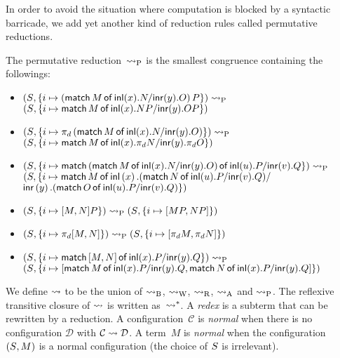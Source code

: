 In order to avoid the situation where computation is blocked by
a syntactic barricade,
we add yet another kind of reduction rules called permutative
 reductions.
\begin{definition}
 The permutative reduction~$\preduce$ is the smallest congruence
 containing the followings:
\begin{itemize}
 \small
 \item $\conf{}{\imapsto{ \left(\mat  M x N y O\right) P }}\preduce$ \\
       $\conf{}{\imapsto{ \mat M x {N P} y {O P} }}$
 \item $\conf{}{\imapsto{ \pi_d \left(\mat M x N y
       O\right)}}\preduce$\\
       $\conf{}{\imapsto{ \mat M x
       {\pi_d N} y {\pi_d O} }}$
 \item {
       $\conf{}{\imapsto{ \mat
                          {\left(\mat  M x N y O\right)}
                          u P v Q
                     } }\preduce$ \\
       $(\lstore,
       \{i\mapsto
        \mathsf{match}\,{M}\,\mathsf{of}\, \linl{x}. {
                          {\left(\mat N u P v Q\right)}
       } /$ \\ \phantom{mmmmmmmmmmm}$
       \linr{y}. {\left(\mat  O u P v Q\right)}
                      \})
       $}
 \item $\conf{}{ \imapsto{\cotuple{M, N} P} }\preduce
        \conf{}{ \imapsto{\cotuple{MP, NP} }}$
 \item $\conf{}{ \imapsto{\pi_d\cotuple{M,N} }}\preduce
        \conf{}{ \imapsto{\cotuple{\pi_d M, \pi_d N}} }$
 \item $\conf{}{ \imapsto{\mat {\cotuple{M,N}} x P y Q }}\preduce$\\
       $\conf{}{ \imapsto{\cotuple{
                          \mat  M x P y Q,
                          \mat N x P y Q
                        }} }$
\end{itemize}
\end{definition}

We define $\reduce$ to be the union of $\breduce$, $\wreduce$, $\rreduce$,
$\areduce$ and $\preduce$.
The reflexive transitive closure of $\reduce$ is
written as~$\reduction$.
A \textit{redex} is a subterm that can be rewritten by a reduction.
A configuration~$\mathcal{C}$ is \textit{normal} when
there is no configuration
$\mathcal{D}$ with $\mathcal{C}\reduce \mathcal{D}$.
A term~$M$ is \textit{normal} when the configuration $\conf{}{M}$ is
a normal configuration (the choice of $\lstore$ is irrelevant).

